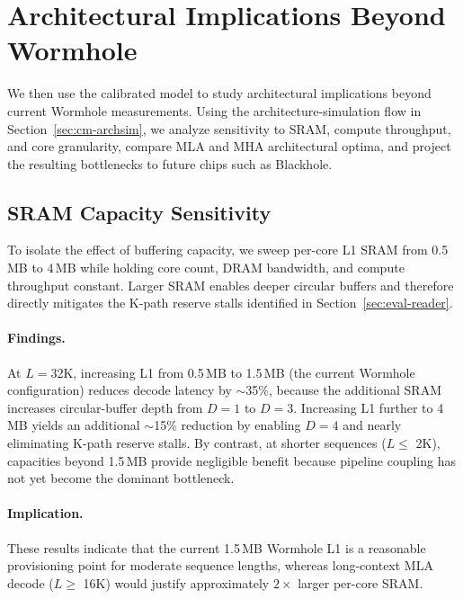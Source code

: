 \documentclass[sigconf, review, anonymous]{acmart}
\begin{document}
\section{Architectural Implications Beyond Wormhole}\label{sec:arch-explore}

We then use the calibrated model to study architectural implications
beyond current Wormhole measurements.  Using the architecture-simulation
flow in Section~\ref{sec:cm-archsim}, we analyze sensitivity to SRAM,
compute throughput, and core granularity, compare MLA and MHA
architectural optima, and project the resulting bottlenecks to future
chips such as Blackhole.



\subsection{SRAM Capacity Sensitivity}\label{sec:arch-sram}


To isolate the effect of buffering capacity, we sweep per-core L1 SRAM
from 0.5\,MB to 4\,MB while holding core count, DRAM bandwidth, and
compute throughput constant.  Larger SRAM enables deeper circular
buffers and therefore directly mitigates the K-path reserve stalls
identified in Section~\ref{sec:eval-reader}.

\paragraph{Findings.}
At $L{=}$32K, increasing L1 from 0.5\,MB to 1.5\,MB (the current
Wormhole configuration) reduces decode latency by $\sim$35\%, because
the additional SRAM increases circular-buffer depth from $D{=}1$ to
$D{=}3$.  Increasing L1 further to 4\,MB yields an additional
$\sim$15\% reduction by enabling $D{=}4$ and nearly eliminating K-path
reserve stalls.  By contrast, at shorter sequences ($L \leq$ 2K),
capacities beyond 1.5\,MB provide negligible benefit because pipeline
coupling has not yet become the dominant bottleneck.

\paragraph{Implication.}
These results indicate that the current 1.5\,MB Wormhole L1 is a
reasonable provisioning point for moderate sequence lengths, whereas
long-context MLA decode ($L \geq$ 16K) would justify approximately
$2\times$ larger per-core SRAM.
\end{document}
